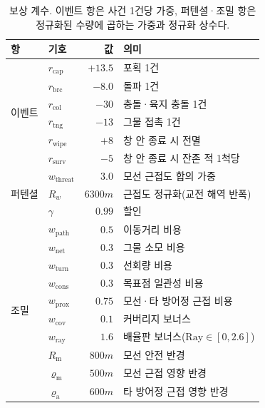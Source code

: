 \begin{table}[tp]
\centering
\caption{보상 계수. 이벤트 항은 사건 1건당 가중, 퍼텐셜·조밀 항은 정규화된 수량에 곱하는
         가중과 정규화 상수다.}
\label{tab:reward_coef}
\footnotesize
\renewcommand{\arraystretch}{1.15}
\begin{tabular}{@{}llr@{\hspace{2mm}}l@{}}
\toprule
항 & 기호 & 값 & 의미 \\
\midrule
\multirow{6}{*}{이벤트}
 & $r_{\mathrm{cap}}$  & $+13.5$ & 포획 1건 \\
 & $r_{\mathrm{brc}}$  & $-8.0$  & 돌파 1건 \\
 & $r_{\mathrm{col}}$  & $-30$   & 충돌·육지 충돌 1건 \\
 & $r_{\mathrm{tng}}$  & $-13$   & 그물 접촉 1건 \\
 & $r_{\mathrm{wipe}}$ & $+8$    & 창 안 종료 시 전멸 \\
 & $r_{\mathrm{surv}}$ & $-5$    & 창 안 종료 시 잔존 적 1척당 \\
\midrule
\multirow{3}{*}{퍼텐셜}
 & $w_{\mathrm{threat}}$ & $3.0$  & 모선 근접도 합의 가중 \\
 & $R_w$                 & $6300\unit{m}$ & 근접도 정규화(교전 해역 반폭) \\
 & $\gamma$              & $0.99$ & 할인 \\
\midrule
\multirow{10}{*}{조밀}
 & $w_{\mathrm{path}}$ & $0.5$  & 이동거리 비용 \\
 & $w_{\mathrm{net}}$  & $0.3$  & 그물 소모 비용 \\
 & $w_{\mathrm{turn}}$ & $0.3$  & 선회량 비용 \\
 & $w_{\mathrm{cons}}$ & $0.3$  & 목표점 일관성 비용 \\
 & $w_{\mathrm{prox}}$ & $0.75$ & 모선·타 방어정 근접 비용 \\
 & $w_{\mathrm{cov}}$  & $0.1$  & 커버리지 보너스 \\
 & $w_{\mathrm{ray}}$  & $1.6$  & 배율판 보너스($\mathrm{Ray} \in [0, 2.6]$) \\
 & $R_{\mathrm{m}}$      & $800\unit{m}$ & 모선 안전 반경 \\
 & $\varrho_{\mathrm{m}}$ & $500\unit{m}$ & 모선 근접 영향 반경 \\
 & $\varrho_{\mathrm{a}}$ & $600\unit{m}$ & 타 방어정 근접 영향 반경 \\
\bottomrule
\end{tabular}
\end{table}

